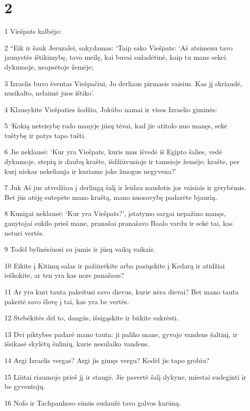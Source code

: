\chapter{2}


\par 1 Viešpats kalbėjo: 
\par 2 “Eik ir šauk Jeruzalei, sakydamas: ‘Taip sako Viešpats: ‘Aš atsimenu tavo jaunystės ištikimybę, tavo meilę, kai buvai sužadėtinė, kaip tu mane sekei dykumoje, neapsėtoje žemėje; 
\par 3 Izraelis buvo šventas Viešpačiui, Jo derliaus pirmasis vaisius. Kas jį skriaudė, nusikalto, nelaimė juos ištiko’. 
\par 4 Klausykite Viešpaties žodžio, Jokūbo namai ir visos Izraelio giminės: 
\par 5 ‘Kokią neteisybę rado manyje jūsų tėvai, kad jie atitolo nuo manęs, sekė tuštybę ir patys tapo tušti. 
\par 6 Jie neklausė: ‘Kur yra Viešpats, kuris mus išvedė iš Egipto šalies, vedė dykumoje, stepių ir daubų krašte, išdžiūvusioje ir tamsioje žemėje; krašte, per kurį niekas nekeliauja ir kuriame joks žmogus negyvena?’ 
\par 7 Juk Aš jus atvedžiau į derlingą šalį ir leidau naudotis jos vaisiais ir gėrybėmis. Bet jūs atėję sutepėte mano kraštą, mano nuosavybę padarėte bjaurią. 
\par 8 Kunigai neklausė: ‘Kur yra Viešpats?’, įstatymo sargai nepažino manęs, ganytojai sukilo prieš mane, pranašai pranašavo Baalo vardu ir sekė tai, kas neturi vertės. 
\par 9 Todėl bylinėsiuosi su jumis ir jūsų vaikų vaikais. 
\par 10 Eikite į Kitimų salas ir pažiūrėkite arba pasiųskite į Kedarą ir atidžiai ieškokite, ar ten yra kas nors panašaus? 
\par 11 Ar yra kuri tauta pakeitusi savo dievus, kurie nėra dievai? Bet mano tauta pakeitė savo šlovę į tai, kas yra be vertės. 
\par 12 Stebėkitės dėl to, dangūs, išsigąskite ir būkite sukrėsti. 
\par 13 Dvi piktybes padarė mano tauta: ji paliko mane, gyvojo vandens šaltinį, ir išsikasė skylėtų šulinių, kurie nesulaiko vandens. 
\par 14 Argi Izraelis vergas? Argi jis gimęs vergu? Kodėl jis tapo grobiu? 
\par 15 Liūtai riaumojo prieš jį ir staugė. Jie pavertė šalį dykyne, miestai sudeginti ir be gyventojų. 
\par 16 Nofo ir Tachpanheso sūnūs sudaužė tavo galvos karūną. 
